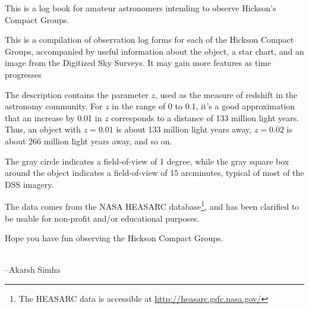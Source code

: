 This is a log book for amateur astronomers intending to observe
Hickson's Compact Groups.

This is a compilation of observation log forms for each of the Hickson
Compact Groups, accompanied by useful information about the object, a
star chart, and an image from the Digitized Sky Surveys. It may gain
more features as time progresses

The description contains the parameter $z$, used as the measure of
redshift in the astronomy community. For $z$ in the range of 0 to 0.1,
it's a good approximation that an increase by 0.01 in $z$ corresponds
to a distance of 133 million light years. Thus, an object with $z =
0.01$ is about 133 million light years away, $z = 0.02$ is about 266
million light years away, and so on.

The gray circle indicates a field-of-view of 1 degree, while the gray
square box around the object indicates a field-of-view of 15
arcminutes, typical of most of the DSS imagery.

The data comes from the NASA HEASARC database\footnote{The HEASARC
data is accessible at \url{http://heasarc.gsfc.nasa.gov/}}, and has
been clarified to be usable for non-profit and/or educational
purposes.

Hope you have fun observing the Hickson Compact Groups.

\\

\hfill --Akarsh Simha
